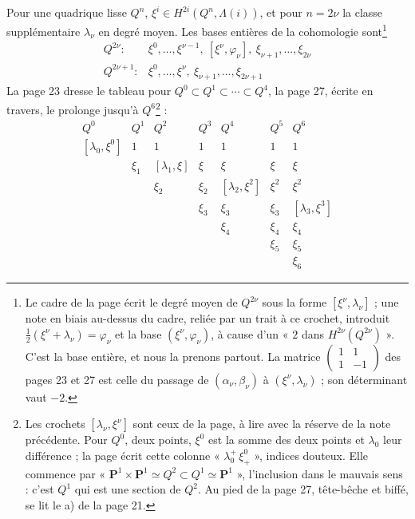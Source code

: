 \documentclass[11pt,a4paper]{article}
\begin{document}
Pour une quadrique lisse $Q^{n}$, $\xi^{i} \in H^{2i}(Q^{n}, \Lambda(i))$, et
pour $n = 2\nu$ la classe supplémentaire $\lambda_{\nu}$ en degré moyen. Les
bases entières de la cohomologie sont\footnote{Le cadre de la page écrit le degré moyen de $Q^{2\nu}$ sous la
forme $[\xi^{\nu}, \lambda_{\nu}]$ ; une note en biais au-dessus du cadre,
reliée par un trait à ce crochet, introduit
$\tfrac12(\xi^{\nu} + \lambda_{\nu}) = \varphi_{\nu}$ et la base
$(\xi^{\nu}, \varphi_{\nu})$, à cause d'un « $2$ dans
$H^{2\nu}(Q^{2\nu})$ ». C'est la base entière, et nous la prenons partout.
La matrice $\left(\begin{smallmatrix} 1 & 1 \\ 1 & -1 \end{smallmatrix}\right)$
des pages 23 et 27 est celle du passage de $(\alpha_{\nu}, \beta_{\nu})$ à
$(\xi^{\nu}, \lambda_{\nu})$ ; son déterminant vaut $-2$.}
\[
  \begin{array}{ll}
    Q^{2\nu} : & \xi^{0}, \ldots, \xi^{\nu-1}, \ [\xi^{\nu}, \varphi_{\nu}], \
      \xi_{\nu+1}, \ldots, \xi_{2\nu} \\[4pt]
    Q^{2\nu+1} : & \xi^{0}, \ldots, \xi^{\nu}, \ \xi_{\nu+1}, \ldots, \xi_{2\nu+1}
  \end{array}
\]
 La page 23 dresse
le tableau pour $Q^{0} \subset Q^{1} \subset \cdots \subset Q^{4}$, la page
27, écrite en travers, le prolonge jusqu'à $Q^{6}$\footnote{Les crochets $[\lambda_{\nu}, \xi^{\nu}]$ sont ceux de la page, à
lire avec la réserve de la note précédente. Pour $Q^{0}$, deux points,
$\xi^{0}$ est la somme des deux points et $\lambda_{0}$ leur différence ;
la page écrit cette colonne « $\lambda_{0}^{+}\,\xi^{0}_{+}$ », indices
douteux. Elle commence par «
$\mathbf{P}^{1} \times \mathbf{P}^{1} \simeq Q^{2} \subset Q^{1} \simeq
\mathbf{P}^{1}$ », l'inclusion dans le mauvais sens : c'est $Q^{1}$ qui
est une section de $Q^{2}$. Au pied de la page 27, tête-bêche et biffé, se
lit le a) de la page 21.} :
\[
  \begin{array}{ccccccc}
    Q^{0} & Q^{1} & Q^{2} & Q^{3} & Q^{4} & Q^{5} & Q^{6} \\[4pt]
    [\lambda_{0}, \xi^{0}] & 1 & 1 & 1 & 1 & 1 & 1 \\
     & \xi_{1} & [\lambda_{1}, \xi] & \xi & \xi & \xi & \xi \\
     & & \xi_{2} & \xi_{2} & [\lambda_{2}, \xi^{2}] & \xi^{2} & \xi^{2} \\
     & & & \xi_{3} & \xi_{3} & \xi_{3} & [\lambda_{3}, \xi^{3}] \\
     & & & & \xi_{4} & \xi_{4} & \xi_{4} \\
     & & & & & \xi_{5} & \xi_{5} \\
     & & & & & & \xi_{6}
  \end{array}
\]
\end{document}
